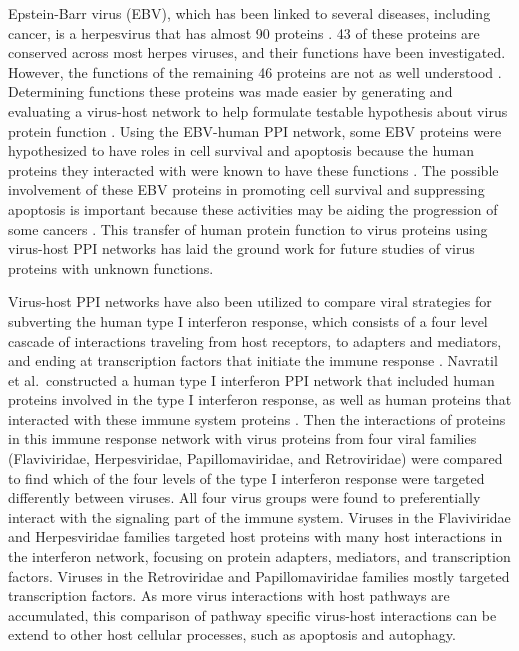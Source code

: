 Epstein-Barr virus (EBV), which has been linked to several diseases,
including cancer, is a herpesvirus that has almost 90 proteins
\cite{calderwood07}. 43 of these proteins are conserved across most
herpes viruses, and their functions have been investigated. However,
the functions of the remaining 46 proteins are not as well understood
\cite{calderwood07}. Determining functions these proteins was made
easier by generating and evaluating a virus-host network to help
formulate testable hypothesis about virus protein function
\cite{calderwood07}. Using the EBV-human PPI network, some EBV
proteins were hypothesized to have roles in cell survival and
apoptosis because the human proteins they interacted with were known
to have these functions \cite{calderwood07}. The possible involvement
of these EBV proteins in promoting cell survival and suppressing
apoptosis is important because these activities may be aiding the
progression of some cancers \cite{young2004epstein}. This transfer of
human protein function to virus proteins using virus-host PPI networks
has laid the ground work for future studies of virus proteins with
unknown functions.

Virus-host PPI networks have also been utilized to compare viral
strategies for subverting the human type I interferon response, which
consists of a four level cascade of interactions traveling from host
receptors, to adapters and mediators, and ending at transcription
factors that initiate the immune response
\cite{navratil-system}. Navratil et al.\ constructed a human type I
interferon PPI network that included human proteins involved in the
type I interferon response, as well as human proteins that interacted
with these immune system proteins \cite{navratil-system}. Then the
interactions of proteins in this immune response network with virus
proteins from four viral families (Flaviviridae, Herpesviridae,
Papillomaviridae, and Retroviridae) were compared to find which of the
four levels of the type I interferon response were targeted
differently between viruses. All four virus groups were found to
preferentially interact with the signaling part of the immune
system. Viruses in the Flaviviridae and Herpesviridae families
targeted host proteins with many host interactions in the interferon
network, focusing on protein adapters, mediators, and transcription
factors. Viruses in the Retroviridae and Papillomaviridae families
mostly targeted transcription factors. As more virus interactions with
host pathways are accumulated, this comparison of pathway specific
virus-host interactions can be extend to other host cellular
processes, such as apoptosis and autophagy.

